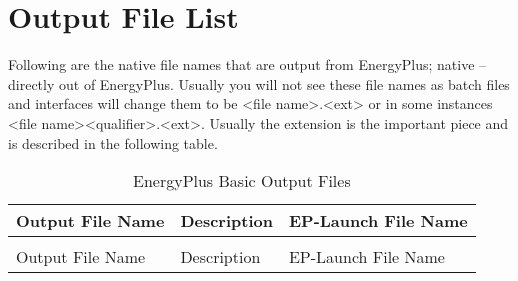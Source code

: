 \section{Output File List}\label{output-file-list}

Following are the native file names that are output from EnergyPlus; native -- directly out of EnergyPlus. Usually you will not see these file names as batch files and interfaces will change them to be \textless{}file name\textgreater{}.\textless{}ext\textgreater{} or in some instances \textless{}file name\textgreater{}\textless{}qualifier\textgreater{}.\textless{}ext\textgreater{}. Usually the extension is the important piece and is described in the following table.

\begin{longtable}[c]{p{1.5in}p{3.0in}p{1.5in}}
\caption{EnergyPlus Basic Output  Files \label{table:energyplus-basic-output-files}} \tabularnewline
\toprule 
Output File Name & Description & EP-Launch File Name \tabularnewline
\midrule
\endfirsthead

\caption[]{EnergyPlus Basic Output  Files} \tabularnewline
\toprule 
Output File Name & Description & EP-Launch File Name \tabularnewline
\midrule
\endhead


\end{longtable}
